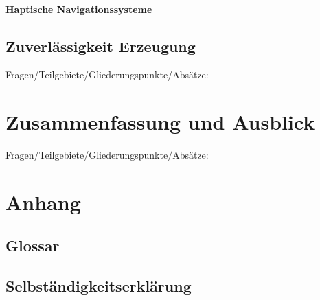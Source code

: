 \documentclass{llncs}					%
\begin{document}
\paragraph{Haptische Navigationssysteme}

\subsection{Zuverlässigkeit Erzeugung}
Fragen/Teilgebiete/Gliederungspunkte/Absätze:

\newpage
\section{Zusammenfassung und Ausblick}
Fragen/Teilgebiete/Gliederungspunkte/Absätze:

\newpage
\section{Anhang}

\clearpage
\subsection{Glossar}\label{glossar}

\renewcommand*{\glossarysection}[2][]{}	%
\printnoidxglossaries				%

\subsection{Selbständigkeitserklärung}

\clearpage

\end{document}
